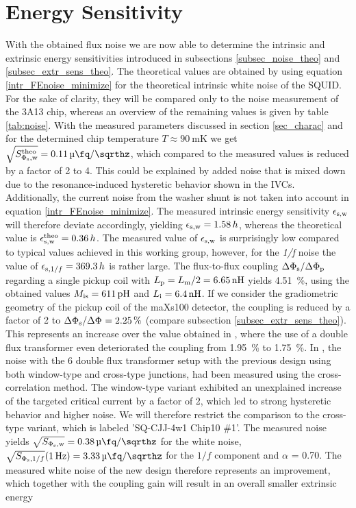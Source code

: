 \section{Energy Sensitivity}

With the obtained flux noise we are now able to determine the intrinsic and extrinsic energy sensitivities introduced in subsections \ref{subsec_noise_theo} and \ref{subsec_extr_sens_theo}. The theoretical values are obtained by using equation \ref{intr_FEnoise_minimize} for the theoretical intrinsic white noise of the SQUID. For the sake of clarity, they will be compared only to the noise measurement of the 3A13 chip, whereas an overview of the remaining values is given by table \ref{tab:noise}. With the measured parameters discussed in section \ref{sec_charac} and for the determined chip temperature $T\approx \qty{90}{\milli\kelvin}$ we get $\sqrt{S_{\rm \Phi_{\rm s},w}^{\rm theo}}=\qty{0.11}{\micro\fq\per\sqrthz}$, which compared to the measured values is reduced by a factor of 2 to 4. This could be explained by added noise that is mixed down due to the resonance-induced hysteretic behavior shown in the IVCs. Additionally, the current noise from the washer shunt is not taken into account in equation \ref{intr_FEnoise_minimize}. The measured intrinsic energy sensitivity $\epsilon_{\rm s,w}$ will therefore deviate accordingly, yielding $\epsilon_{\rm s,w}=1.58\, h$, whereas the theoretical value is $\epsilon_{\rm s,w}^{\rm theo}=0.36\, h$. The measured value of $\epsilon_{\rm s,w}$ is surprisingly low compared to typical values achieved in this working group, however, for the \textit{1/f} noise the value of $\epsilon_{{\rm s},1/f}=369.3\, h$ is rather large. The flux-to-flux coupling $\Delta\Phi_{\rm s}/\Delta\Phi_{\rm p}$ regarding a single pickup coil with $L_{\rm p}=L_{\rm m}/2=\qty{6.65}{\nH}$ yields \qty{4.51}{\percent}, using the obtained values $M_{\rm is}=\qty{611}{\pH}$ and  $L_{\rm i}=\qty{6.4}{\nH}$. If we consider the gradiometric geometry of the pickup coil of the maXs100 detector, the coupling is reduced by a factor of 2 to $\Delta\Phi_{\rm s}/\Delta\Phi_{\rm }=\qty{2.25}{\percent}$ (compare subsection \ref{subsec_extr_sens_theo}). This represents an increase over the value obtained in \cite{Bauer2022}, where the use of a double flux transformer even deteriorated the coupling from \qty{1.95}{\percent} to \qty{1.75}{\percent}. In \cite{Bauer2022}, the noise with the \qty{6}{\nH} double flux transformer setup with the previous design using both window-type and cross-type junctions, had been measured using the cross-correlation method. The window-type variant exhibited an unexplained increase of the targeted critical current by a factor of 2, which led to strong hysteretic behavior and higher noise. We will therefore restrict the comparison to the cross-type variant, which is labeled 'SQ-CJJ-4w1 Chip10 $\#$1'. The measured noise yields $\sqrt{S_{\rm \Phi_{\rm s},w}}=\qty{0.38}{\micro\fq\per\sqrthz}$ for the white noise, $\sqrt{S_{\Phi_{\rm s},1/f}}(\qty{1}{\Hz})=\qty{3.33}{\micro\fq\per\sqrthz}$ for the $1/f$ component and $\alpha$ = 0.70. The measured white noise of the new design therefore represents an improvement, which together with the coupling gain will result in an overall smaller extrinsic energy 